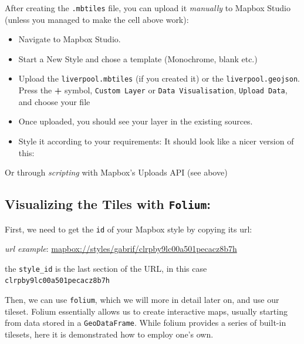 \documentclass[
  letterpaper,
  DIV=11,
  numbers=noendperiod]{scrreprt}
\providecommand{\tightlist}{%
  \setlength{\itemsep}{0pt}\setlength{\parskip}{0pt}}\usepackage{longtable,booktabs,array}
\begin{document}
After creating the \texttt{.mbtiles} file, you can upload it
\emph{manually} to Mapbox Studio (unless you managed to make the cell
above work):

\begin{itemize}
\tightlist
\item
  Navigate to Mapbox Studio.
\item
  Start a New Style and chose a template (Monochrome, blank etc.)
\end{itemize}

\begin{itemize}
\tightlist
\item
  Upload the \texttt{liverpool.mbtiles} (if you created it) or the
  \texttt{liverpool.geojson}. Press the \textbf{+} symbol,
  \texttt{Custom\ Layer} or \texttt{Data\ Visualisation},
  \texttt{Upload\ Data}, and choose your file
\end{itemize}

\begin{itemize}
\tightlist
\item
  Once uploaded, you should see your layer in the existing sources.
\end{itemize}

\begin{itemize}
\tightlist
\item
  Style it according to your requirements: It should look like a nicer
  version of this:
\end{itemize}

Or through \emph{scripting} with Mapbox's Uploads API (see above)

\hypertarget{visualizing-the-tiles-with-folium}{%
\subsection{\texorpdfstring{Visualizing the Tiles with
\texttt{Folium}:}{Visualizing the Tiles with Folium:}}\label{visualizing-the-tiles-with-folium}}

First, we need to get the \texttt{id} of your Mapbox style by copying
its url:

\emph{url example}:
\url{mapbox://styles/gabrif/clrpby9lc00a501pecacz8b7h}

the \texttt{style\_id} is the last section of the URL, in this case
\texttt{clrpby9lc00a501pecacz8b7h}

Then, we can use \texttt{folium}, which we will more in detail later on,
and use our tileset. Folium essentially allows us to create interactive
maps, usually starting from data stored in a \texttt{GeoDataFrame}.
While folium provides a series of built-in tilesets, here it is
demonstrated how to employ one's own.
\end{document}
